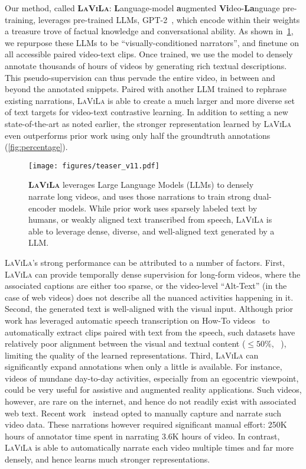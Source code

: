 \documentclass[10pt,twocolumn,letterpaper]{article}
\newcommand{\ours}{\textsc{LaViLa}\xspace}
\begin{document}
Our method, called {\bf \ours}:
{\bf L}anguage-model {\bf a}ugmented {\bf Vi}deo-{\bf La}nguage pre-training,
leverages pre-trained LLMs, \eg GPT-2~\cite{radford2019gpt2},
which encode within their weights a treasure trove of factual knowledge and conversational ability.
As shown in~\cref{fig:teaser}, we repurpose these LLMs to be ``visually-conditioned narrators'', and finetune on all accessible paired video-text clips. Once trained,
we use the model to densely annotate thousands of hours of videos by generating rich textual descriptions.
This pseudo-supervision can thus pervade the entire video, in between and beyond the annotated snippets.
Paired with another LLM trained to rephrase existing narrations, \ours is able to create a much larger and more diverse set of text targets for video-text contrastive learning.
In addition to setting a new state-of-the-art as noted earlier, the stronger representation learned by \ours
even outperforms prior work using only half the groundtruth annotations (\cref{fig:percentage}).


\begin{figure}[t]
	\begin{center}
		\centering
		\texttt{[image: figures/teaser\_v11.pdf]}
		\caption{
			{\bf \ours} leverages Large Language Models (LLMs) to densely narrate long videos, and uses those narrations to train strong dual-encoder models. While prior work uses sparsely labeled text by humans, or weakly aligned text transcribed from speech, \ours is able to leverage dense, diverse, and well-aligned text generated by a LLM.
		}
		\label{fig:teaser}
	\end{center}
\end{figure}


\ours's strong performance can be attributed to a number of factors.
First, \ours can provide temporally dense supervision for long-form videos, where the associated captions are either too sparse, or the video-level ``Alt-Text'' (in the case of web videos) does not describe all the nuanced activities happening in it.
Second, the generated text is well-aligned with the visual input.
Although prior work has leveraged automatic speech transcription on How-To videos~\cite{miech2019howto100m} to automatically extract clips paired with text from the speech, such datasets have relatively poor alignment between the visual and textual content ($\le50\%$, \cf~\cite{miech2019howto100m,han2022tan}), limiting the quality of the learned representations.
Third, \ours can significantly expand annotations when only a little is available.
For instance, videos of mundane day-to-day activities, especially from an egocentric viewpoint, could be very useful for assistive and augmented reality applications.
Such videos, however, are rare on the internet, and hence do not readily exist with associated web text. Recent work~\cite{grauman2022ego4d} instead opted to manually capture and narrate such video data.
These narrations however required significant manual effort: 250K hours of annotator time spent in narrating 3.6K hours of video.
In contrast, \ours is able to automatically narrate each video multiple times and far more densely, and hence learns much stronger representations.
\end{document}
